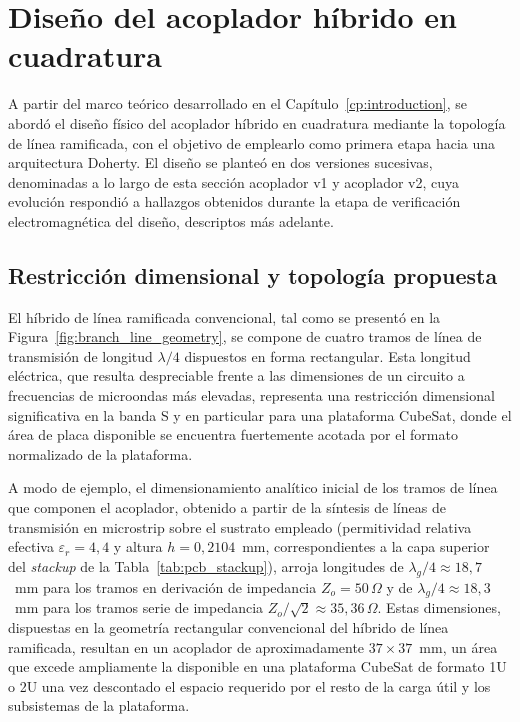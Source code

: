\section{Diseño del acoplador híbrido en cuadratura} \label{sec:diseno_acoplador}
A partir del marco teórico desarrollado en el Capítulo~\ref{cp:introduction}, se abordó el diseño físico del acoplador híbrido en cuadratura mediante la topología de línea ramificada, con el objetivo de emplearlo como primera etapa hacia una arquitectura Doherty. El diseño se planteó en dos versiones sucesivas, denominadas a lo largo de esta sección acoplador v1 y acoplador v2, cuya evolución respondió a hallazgos obtenidos durante la etapa de verificación electromagnética del diseño, descriptos más adelante.

\subsection{Restricción dimensional y topología propuesta}
El híbrido de línea ramificada convencional, tal como se presentó en la Figura~\ref{fig:branch_line_geometry}, se compone de cuatro tramos de línea de transmisión de longitud $\lambda/4$ dispuestos en forma rectangular. Esta longitud eléctrica, que resulta despreciable frente a las dimensiones de un circuito a frecuencias de microondas más elevadas, representa una restricción dimensional significativa en la banda S y en particular para una plataforma CubeSat, donde el área de placa disponible se encuentra fuertemente acotada por el formato normalizado de la plataforma.

A modo de ejemplo, el dimensionamiento analítico inicial de los tramos de línea que componen el acoplador, obtenido a partir de la síntesis de líneas de transmisión en microstrip sobre el sustrato empleado (permitividad relativa efectiva $\varepsilon_r = 4{,}4$ y altura $h = 0{,}2104$~mm, correspondientes a la capa superior del \textit{stackup} de la Tabla~\ref{tab:pcb_stackup}), arroja longitudes de $\lambda_g/4 \approx 18{,}7$~mm para los tramos en derivación de impedancia $Z_o = 50\,\Omega$ y de $\lambda_g/4 \approx 18{,}3$~mm para los tramos serie de impedancia $Z_o/\sqrt{2} \approx 35{,}36\,\Omega$. Estas dimensiones, dispuestas en la geometría rectangular convencional del híbrido de línea ramificada, resultan en un acoplador de aproximadamente $37 \times 37$~mm, un área que excede ampliamente la disponible en una plataforma CubeSat de formato 1U o 2U una vez descontado el espacio requerido por el resto de la carga útil y los subsistemas de la plataforma.

